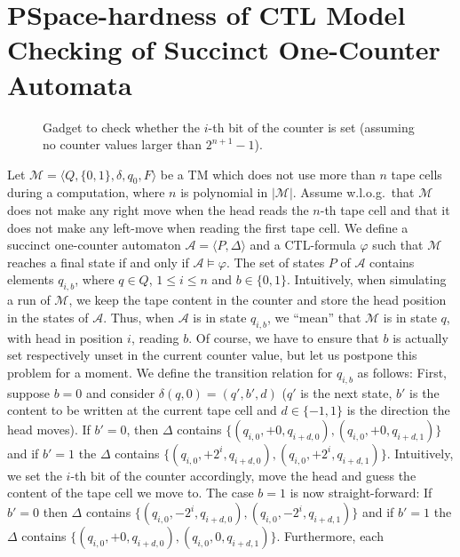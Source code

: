 \documentclass{llncs}
\begin{document}
\section{PSpace-hardness of CTL Model Checking of Succinct One-Counter
Automata}

\begin{figure}
\caption{Gadget to check whether the $i$-th bit of the counter is
set (assuming no counter values larger than $2^{n+1}-1$).}
\label{fig:checker}
\end{figure}
Let $\mathcal{M}=\langle Q, \{0,1\}, \delta, q_0, F\rangle$ be a TM
which does not use more than $n$ tape cells during a computation,
where $n$ is polynomial in $|\mathcal{M}|$. Assume w.l.o.g.\ that
$\mathcal{M}$ does not make any right move when the head reads the
$n$-th tape cell and that it does not make any left-move when reading
the first tape cell. We define a succinct one-counter automaton
$\mathcal{A}=\langle P, \Delta \rangle$ and a CTL-formula $\varphi$
such that $\mathcal{M}$ reaches a final state if and only if
$\mathcal{A}\models \varphi$. The set of states $P$ of $\mathcal{A}$
contains elements $q_{i,b}$, where $q\in Q$, $1\le i\le n$ and $b\in
\{0,1\}$. Intuitively, when simulating a run of $\mathcal{M}$, we keep
the tape content in the counter and store the head position in the
states of $\mathcal{A}$. Thus, when $\mathcal{A}$ is in state
$q_{i,b}$, we ``mean'' that $\mathcal{M}$ is in state $q$, with head
in position $i$, reading $b$. Of course, we have to ensure that $b$ is
actually set respectively unset in the current counter value, but let
us postpone this problem for a moment. We define the transition
relation for $q_{i,b}$ as follows: First, suppose $b=0$ and consider
$\delta(q,0)=(q',b',d)$ ($q'$ is the next state, $b'$ is the content
to be written at the current tape cell and $d\in\{-1,1\}$ is the
direction the head moves). If $b'=0$, then $\Delta$ contains
$\{(q_{i,0},+0,q_{i+d,0}), (q_{i,0},+0,q_{i+d,1})\}$ and if $b'=1$ the
$\Delta$ contains $\{(q_{i,0},+2^i,q_{i+d,0}),
(q_{i,0},+2^i,q_{i+d,1})\}$. Intuitively, we set the $i$-th bit of the
counter accordingly, move the head and guess the content of the tape
cell we move to. The case $b=1$ is now straight-forward: If $b'=0$
then $\Delta$ contains $\{(q_{i,0},-2^i,q_{i+d,0}),
(q_{i,0},-2^i,q_{i+d,1})\}$ and if $b'=1$ the $\Delta$ contains
$\{(q_{i,0},+0,q_{i+d,0}), (q_{i,0},0,q_{i+d,1})\}$. Furthermore, each
\end{document}
